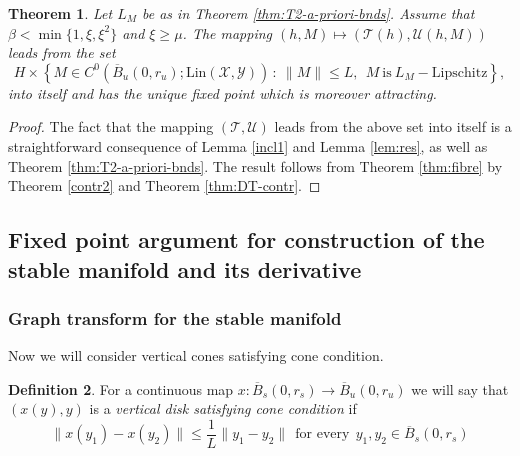 \documentclass[11pt, leqno]{amsart}
\newtheorem{thm}{Theorem}[section]
\theoremstyle{definition}
\newtheorem{df}[thm]{Definition}
\begin{document}
\begin{thm}\label{thm:15}
	Let $L_M$ be as in Theorem \ref{thm:T2-a-priori-bnds}. Assume that $\beta < \min\{1,\xi,\xi^2\}$ and $\xi\geq \mu$. 
	The mapping $(h,M)\mapsto (\mathcal{T}(h),\mathcal{U}(h,M))$ leads from the set  
	$$
	H \times \left\{ M\in C^0(\overline{B}_u(0,r_u);\mathrm{Lin}(\mathcal{X},\mathcal{Y}))\,:\ \|M\| \leq L,\ \  M\  \mathrm{is}\ L_M-\mathrm{Lipschitz} \right\},
	$$
	into itself and has the unique fixed point which is moreover attracting. 
\end{thm}
\begin{proof}
	The fact that the mapping $(\mathcal{T}, \mathcal{U})$ leads from the above set into itself is a straightforward consequence of Lemma \ref{incl1} and Lemma \ref{lem:res}, as well as Theorem \ref{thm:T2-a-priori-bnds}. The result follows from Theorem \ref{thm:fibre} by Theorem \ref{contr2} and Theorem \ref{thm:DT-contr}. 
\end{proof}



\subsection{Fixed point argument for construction of the stable manifold and its derivative}
\subsubsection{Graph transform for the stable manifold}

Now we will consider vertical cones satisfying cone condition.

\begin{df}
\label{def:vd-cc}
For a continuous map $x:\overline{B}_s(0,r_s) \to \overline{B}_u(0,r_u)$
we will say that $(x(y),y)$ is a \emph{vertical  disk satisfying cone condition} if
\begin{equation}
  \|x(y_1)-x(y_2)\| \leq  \frac{1}{L}\|y_1-y_2\|\ \ \textrm{for every}\ \ y_1,y_2\in \overline{B}_s(0,r_s)\label{eq:verdisk}
\end{equation}
\end{df}
\end{document}
